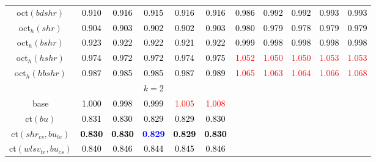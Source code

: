 \begin{tabular}[t]{c|>{}cccc>{}c|ccccc}
oct$(bdshr)$ & \textcolor{black}{0.910} & \textcolor{black}{0.916} & \textcolor{black}{0.915} & \textcolor{black}{0.916} & \textcolor{black}{0.916} & \textcolor{black}{0.986} & \textcolor{black}{0.992} & \textcolor{black}{0.992} & \textcolor{black}{0.993} & \textcolor{black}{0.993}\\
oct$_h(shr)$ & \textcolor{black}{0.904} & \textcolor{black}{0.903} & \textcolor{black}{0.902} & \textcolor{black}{0.902} & \textcolor{black}{0.903} & \textcolor{black}{0.980} & \textcolor{black}{0.979} & \textcolor{black}{0.978} & \textcolor{black}{0.979} & \textcolor{black}{0.979}\\
oct$_h(bshr)$ & \textcolor{black}{0.923} & \textcolor{black}{0.922} & \textcolor{black}{0.922} & \textcolor{black}{0.921} & \textcolor{black}{0.922} & \textcolor{black}{0.999} & \textcolor{black}{0.998} & \textcolor{black}{0.998} & \textcolor{black}{0.998} & \textcolor{black}{0.998}\\
oct$_h(hshr)$ & \textcolor{black}{0.974} & \textcolor{black}{0.972} & \textcolor{black}{0.972} & \textcolor{black}{0.974} & \textcolor{black}{0.975} & \textcolor{red}{1.052} & \textcolor{red}{1.050} & \textcolor{red}{1.050} & \textcolor{red}{1.053} & \textcolor{red}{1.053}\\
oct$_h(hbshr)$ & \textcolor{black}{0.987} & \textcolor{black}{0.985} & \textcolor{black}{0.985} & \textcolor{black}{0.987} & \textcolor{black}{0.989} & \textcolor{red}{1.065} & \textcolor{red}{1.063} & \textcolor{red}{1.064} & \textcolor{red}{1.066} & \textcolor{red}{1.068}\\
\addlinespace[0.3em]
\multicolumn{1}{c}{} & \multicolumn{5}{c}{\textbf{$k = 2$}} & \multicolumn{5}{c}{}\\
base & \textcolor{black}{1.000} & \textcolor{black}{0.998} & \textcolor{black}{0.999} & \textcolor{red}{1.005} & \textcolor{red}{1.008} &  &  &  &  & \\
ct$(bu)$ & \textcolor{black}{0.831} & \textcolor{black}{0.830} & \textcolor{black}{0.829} & \textcolor{black}{0.829} & \textcolor{black}{0.830} &  &  &  &  & \\
ct$(shr_{cs}, bu_{te})$ & \textcolor{black}{\textbf{0.830}} & \textcolor{black}{\textbf{0.830}} & \textcolor{blue}{\textbf{0.829}} & \textcolor{black}{\textbf{0.829}} & \textcolor{black}{\textbf{0.830}} &  &  &  &  & \\
ct$(wlsv_{te}, bu_{cs})$ & \textcolor{black}{0.840} & \textcolor{black}{0.846} & \textcolor{black}{0.844} & \textcolor{black}{0.845} & \textcolor{black}{0.846} &  &  &  &  & \\

\end{tabular}
